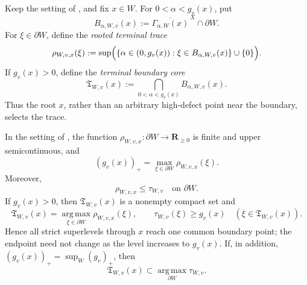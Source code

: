 
\begin{definition}
\label{def:p031-rational-defect-rooted-terminal-trace}
Keep the setting of
, and fix $x\in W$.  For
$0<\alpha<g_v(x)$, put
\begin{equation}
\label{eq:p031-rational-defect-rooted-boundary-contact}
 B_{\alpha,W,v}(x)
   :=\overline{\Gamma_{\alpha,W}(x)}^{\,X}\cap\partial W.
\end{equation}
For $\xi\in\partial W$, define the \emph{rooted terminal trace}
\begin{equation}
\label{eq:p031-rational-defect-rooted-terminal-trace}
 \rho_{W,v,x}(\xi)
  :=\sup\Bigl(
       \{\alpha\in(0,g_v(x)):\xi\in B_{\alpha,W,v}(x)\}
       \cup\{0\}\Bigr).
\end{equation}
If $g_v(x)>0$, define the \emph{terminal boundary core}
\begin{equation}
\label{eq:p031-rational-defect-terminal-boundary-core}
 \mathfrak T_{W,v}(x)
   :=\bigcap_{0<\alpha<g_v(x)}B_{\alpha,W,v}(x).
\end{equation}
Thus the root $x$, rather than an arbitrary high-defect point near the
boundary, selects the trace.
\end{definition}

\begin{theorem}
\label{thm:p031-rational-defect-terminal-boundary-core}
In the setting of
, the function
$\rho_{W,v,x}:\partial W\to\mathbf R_{\geq0}$ is finite and upper
semicontinuous, and
\begin{equation}
\label{eq:p031-rational-defect-rooted-terminal-maximum}
             (g_v(x))_+
                =\max_{\xi\in\partial W}\rho_{W,v,x}(\xi).
\end{equation}
Moreover,
\begin{equation}
\label{eq:p031-rational-defect-rooted-trace-bound}
                \rho_{W,v,x}\leq\tau_{W,v}
                \quad\text{on }\partial W.
\end{equation}
If $g_v(x)>0$, then $\mathfrak T_{W,v}(x)$ is a nonempty compact set and
\begin{equation}
\label{eq:p031-rational-defect-terminal-argmax}
 \mathfrak T_{W,v}(x)
   =\operatorname*{arg\,max}_{\xi\in\partial W}
        \rho_{W,v,x}(\xi),
 \qquad
 \tau_{W,v}(\xi)\geq g_v(x)
       \quad(\xi\in\mathfrak T_{W,v}(x)).
\end{equation}
Hence all strict superlevels through $x$ reach one common boundary point;
the endpoint need not change as the level increases to $g_v(x)$.
If, in addition, $(g_v(x))_+=\sup_W(g_v)_+$, then
\begin{equation}
\label{eq:p031-rational-defect-terminal-max-trace}
 \mathfrak T_{W,v}(x)
   \subset\operatorname*{arg\,max}_{\partial W}\tau_{W,v}.
\end{equation}
\end{theorem}

